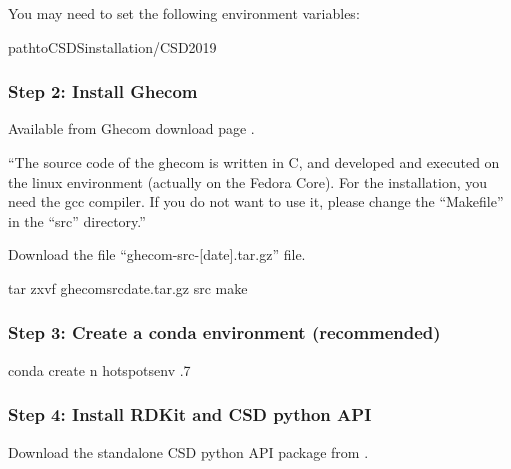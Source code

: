 \documentclass[letterpaper,10pt,english]{sphinxmanual}
\begin{document}
You may need to set the following environment variables:

\begin{sphinxVerbatim}[commandchars=\\\{\}]
 \PYGZlt{}path\PYGZus{}to\PYGZus{}CSDS\PYGZus{}installation\PYGZgt{}/CSD\PYGZus{}2019
\end{sphinxVerbatim}


\subsubsection{Step 2: Install Ghecom}
\label{\detokenize{tutorial:step-2-install-ghecom}}
Available from Ghecom download page .

“The source code of the ghecom is written in C, and developed and executed on
the linux environment (actually on the Fedora Core).  For the installation,
you need the gcc compiler.  If you do not want to use it, please change the
“Makefile” in the “src” directory.”

Download the file “ghecom-src-{[}date{]}.tar.gz” file.

\begin{sphinxVerbatim}[commandchars=\\\{\}]
tar zxvf ghecom\PYGZhy{}src\PYGZhy{}\PYG{o}{[}date\PYG{o}{]}.tar.gz
 src
make
 
\end{sphinxVerbatim}


\subsubsection{Step 3: Create a conda environment (recommended)}
\label{\detokenize{tutorial:step-3-create-a-conda-environment-recommended}}
\begin{sphinxVerbatim}[commandchars=\\\{\}]
conda create \PYGZhy{}n hotspots\PYGZus{}env .7
\end{sphinxVerbatim}


\subsubsection{Step 4: Install RDKit and CSD python API}
\label{\detokenize{tutorial:step-4-install-rdkit-and-csd-python-api}}
Download the standalone CSD python API package from .
\end{document}

